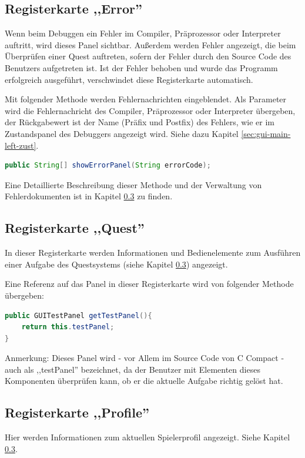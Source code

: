 \subsection{Registerkarte ,,Error''}
Wenn beim Debuggen ein Fehler im Compiler, Präprozessor oder Interpreter auftritt, wird dieses Panel sichtbar. Außerdem werden Fehler angezeigt, die beim Überprüfen einer Quest auftreten, sofern der Fehler durch den Source Code des Benutzers aufgetreten ist. Ist der Fehler behoben und wurde das Programm erfolgreich ausgeführt, verschwindet diese Registerkarte automatisch.

Mit folgender Methode werden Fehlernachrichten eingeblendet. Als Parameter wird die Fehlernachricht des Compiler, Präprozessor oder Interpreter übergeben, der Rückgabewert ist der Name (Präfix und Postfix) des Fehlers, wie er im Zustandspanel des Debuggers angezeigt wird. Siehe dazu Kapitel \ref{sec:gui-main-left-zust}.
\begin{lstlisting}[language=JAVA]
public String[] showErrorPanel(String errorCode);
\end{lstlisting}

Eine Detaillierte Beschreibung dieser Methode und der Verwaltung von Fehlerdokumenten ist in Kapitel \ref{} zu finden.

\subsection{Registerkarte ,,Quest''}
In dieser Registerkarte werden Informationen und Bedienelemente zum Ausführen einer Aufgabe des Questsystems (siehe Kapitel \ref{}) angezeigt.

Eine Referenz auf das Panel in dieser Registerkarte wird von folgender Methode übergeben:
\begin{lstlisting}[language=JAVA]
public GUITestPanel getTestPanel(){
	return this.testPanel;
}
\end{lstlisting}

Anmerkung: Dieses Panel wird - vor Allem im Source Code von C Compact - auch als ,,testPanel'' bezeichnet, da der Benutzer mit Elementen dieses Komponenten überprüfen kann, ob er die aktuelle Aufgabe richtig gelöst hat.

\subsection{Registerkarte ,,Profile''}
Hier werden Informationen zum aktuellen Spielerprofil angezeigt. Siehe Kapitel \ref{}.

